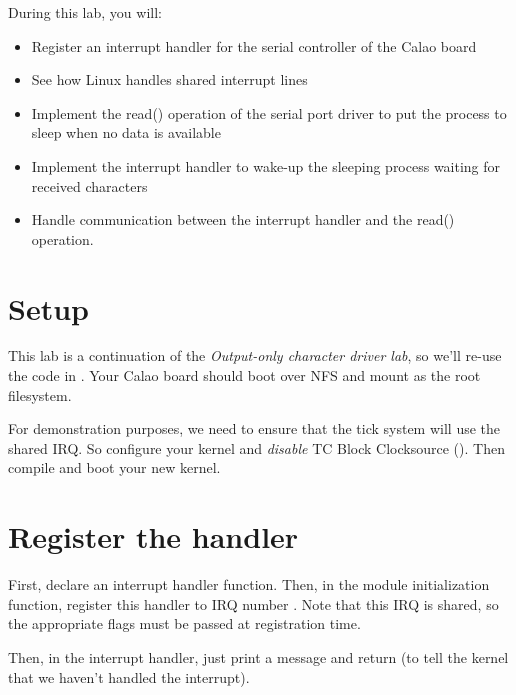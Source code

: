 
During this lab, you will:

\begin{itemize}
\item Register an interrupt handler for the serial controller of the
  Calao board
\item See how Linux handles shared interrupt lines
\item Implement the read() operation of the serial port driver to put
  the process to sleep when no data is available
\item Implement the interrupt handler to wake-up the sleeping process
  waiting for received characters
\item Handle communication between the interrupt handler and the
  read() operation.
\end{itemize}

\section{Setup}

This lab is a continuation of the {\em Output-only character driver
  lab}, so we'll re-use the code in
. Your Calao board should boot over
NFS and mount  as the root
filesystem.

For demonstration purposes, we need to ensure that the tick system will
use the shared IRQ. So configure your kernel and {\em disable} TC
Block Clocksource (). Then compile
and boot your new kernel.

\section{Register the handler}

First, declare an interrupt handler function. Then, in the module
initialization function, register this handler to IRQ number
. Note that this IRQ is shared,
so the appropriate flags must be passed at registration time.

Then, in the interrupt handler, just print a message and
return  (to tell the kernel that we haven't handled
the interrupt).

